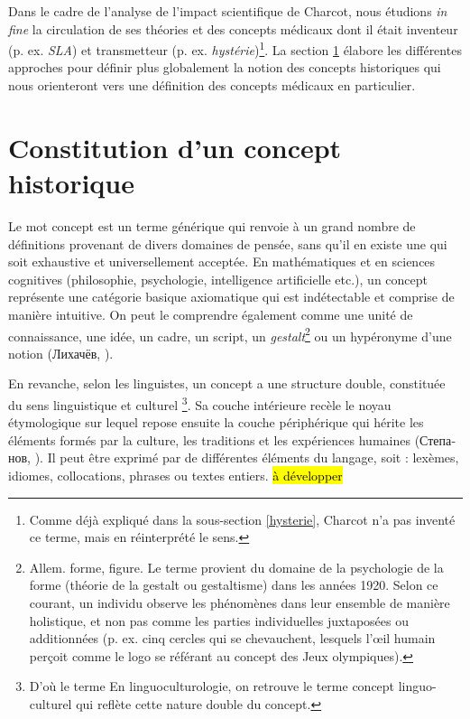Dans le cadre de l'analyse de l'impact scientifique de Charcot, nous étudions \textit{in fine} la circulation de ses théories et des concepts médicaux dont il était inventeur (p. ex. \textit{SLA}) et transmetteur (p. ex. \textit{hystérie})\footnote{Comme déjà expliqué dans la sous-section \ref{hysterie}, Charcot n'a pas inventé ce terme, mais en réinterprété le sens.}. La section \ref{concept} élabore les différentes approches pour définir plus globalement la notion des concepts historiques qui nous orienteront vers une définition des concepts médicaux en particulier. 

\section{Constitution d'un concept historique}
\label{concept}

Le mot \og{}concept\fg{} est un terme générique qui renvoie à un grand nombre de définitions provenant de divers domaines de pensée, sans qu'il en existe une qui soit exhaustive et universellement acceptée. En mathématiques et en sciences cognitives (philosophie, psychologie, intelligence artificielle etc.), un concept représente une catégorie basique axiomatique qui est indétectable et comprise de manière intuitive. On peut le comprendre également comme une unité de connaissance, une idée, un cadre, un script, un \textit{gestalt}\footnote{Allem. \og{}forme, figure\fg{}. Le terme provient du domaine de la psychologie de la forme (théorie de la gestalt ou gestaltisme) dans les années 1920. Selon ce courant, un individu observe les phénomènes dans leur ensemble de manière holistique, et non pas comme les parties individuelles juxtaposées ou additionnées (p. ex. cinq cercles qui se chevauchent, lesquels l'{\oe}il humain perçoit comme le logo se référant au concept des Jeux olympiques).} ou un hypéronyme d'une notion \foreignlanguage{russian}{(Лихачёв, \citeyear{lihachev1997}}). 

En revanche, selon les linguistes, un concept a une structure double, constituée du sens linguistique et culturel
 \citep{nemickiene2011concept}\footnote{D'où le terme En linguoculturologie, on retrouve le terme \og{}concept linguo-culturel\fg{} qui reflète cette nature double du concept.}. Sa couche intérieure recèle le noyau étymologique sur lequel repose ensuite la couche périphérique qui hérite les éléments formés par la culture, les traditions et les expériences humaines \foreignlanguage{russian}{(Степанов, \citeyear{stepanov1997}}). Il peut être exprimé par de différentes éléments du langage, soit : lexèmes, idiomes, collocations, phrases ou textes entiers.  \hl{à développer}
 
